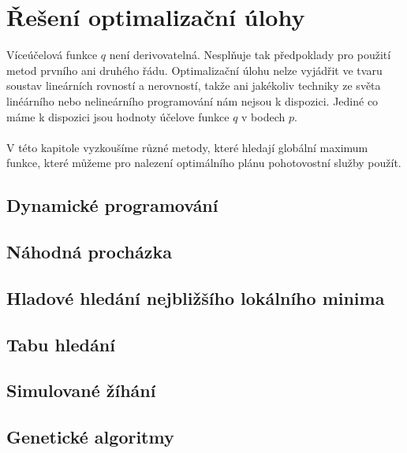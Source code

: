 \chapter{Řešení optimalizační úlohy}

Víceúčelová funkce $q$ není derivovatelná.
Nesplňuje tak předpoklady pro použití metod prvního ani druhého řádu.
Optimalizační úlohu nelze vyjádřit ve tvaru soustav lineárních rovností a nerovností, takže ani jakékoliv techniky ze světa linéárního nebo nelineárního programování nám nejsou k dispozici.
Jediné co máme k dispozici jsou hodnoty účelove funkce $q$ v bodech $p$.
\\
\\
V této kapitole vyzkoušíme různé metody, které hledají globální maximum funkce, které můžeme pro nalezení optimálního plánu pohotovostní služby použít.

\section{Dynamické programování}

\section{Náhodná procházka}

\section{Hladové hledání nejbližšího lokálního minima}

\section{Tabu hledání}

\section{Simulované žíhání}

\section{Genetické algoritmy}


